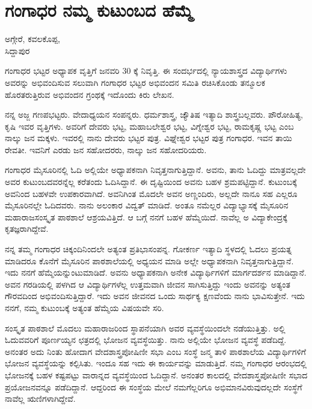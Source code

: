 {\fontsize{14}{16}\selectfont
\chapter{ಗಂಗಾಧರ ನಮ್ಮ ಕುಟುಂಬದ ಹೆಮ್ಮೆ}

\begin{center}
\smallskip

ಅಗ್ಗೇರೆ, ಕವಲಕೊಪ್ಪ,\\ 
ಸಿದ್ದಾಪುರ
\addrule
\end{center}
ಗಂಗಾಧರ ಭಟ್ಟರ ಅಧ್ಯಾಪಕ ವೃತ್ತಿಗೆ ಜನವರಿ 30 ಕ್ಕೆ ನಿವೃತ್ತಿ. ಈ ಸಂದರ್ಭದಲ್ಲಿ ನ್ಯಾಯಶಾಸ್ತ್ರದ ವಿದ್ಯಾರ್ಥಿಗಳು ಅವರನ್ನು ಅಭಿವಂದಿಸುವ ಸಲುವಾಗಿ ಗಂಗಾಧರ ಭಟ್ಟರ ಅಭಿವಂದನ ಸಮಿತಿ ರಚಿಸಿಕೊಂಡು ತನ್ಮೂಲಕ ಹೊರತರುತ್ತಿರುವ ಅಭಿವಂದನ ಗ್ರಂಥಕ್ಕೆ ಇದೊಂದು ಕಿರು ಲೇಖನ.

ನನ್ನ ಅಜ್ಜ ಗಣಪಭಟ್ಟರು. ವೇದಾಧ್ಯಯನ ಸಂಪನ್ನರು. ಧರ್ಮಶಾಸ್ತ್ರ, ಜ್ಯೌತಿಷ ಇತ್ಯಾದಿ ಶಾಸ್ತ್ರಬಲ್ಲವರು. ಪೌರೋಹಿತ್ಯ, ಕೃಷಿ ಇವರ ವೃತ್ತಿಗಳು. ಅವರಿಗೆ ದೇವರು ಭಟ್ಟ, ಮಹಾಬಲೇಶ್ವರ ಭಟ್ಟ, ವಿಗ್ನೇಶ್ವರ ಭಟ್ಟ, ರಾಮಕೃಷ್ಣ ಭಟ್ಟ ಎಂಬ ನಾಲ್ಕು ಜನ ಮಕ್ಕಳು. ಇವರಲ್ಲಿ ನಾನು ದೇವರು ಭಟ್ಟರ ಪುತ್ರ. ವಿಘ್ನೇಶ್ವರ ಭಟ್ಟರ ಪುತ್ರ ಗಂಗಾಧರ. ಇವನ ತಾಯಿ ರೇವತೀ. ಇವನಿಗೆ ಎರಡು ಜನ ಸಹೋದರರು, ನಾಲ್ಕು ಜನ ಸಹೋದರಿಯರು.

ಗಂಗಾಧರ ಮೈಸೂರಿನಲ್ಲಿ ಓದಿ ಅಲ್ಲಿಯೇ ಅಧ್ಯಾಪಕನಾಗಿ ನಿವೃತ್ತನಾಗುತ್ತಿದ್ದಾನೆ. ಅವನು, ತಾನು ಓದಿದ್ದು ಮಾತ್ರವಲ್ಲದೇ ಅವರ ಕುಟುಂಬದವರನ್ನೆಲ್ಲ ಕರೆತಂದು ಓದಿಸಿದ್ದಾನೆ. ಈ ದೃಷ್ಟಿಯಿಂದ ಅವನು ಬಹಳ ಶ್ರಮಪಟ್ಟಿದ್ದಾನೆ. ಕುಟುಂಬಕ್ಕೆ ಅವನಿಂದ ಬಹಳವೇ ಉಪಕಾರವಾಗಿದೆ. ಅವನಿಗಿಂತ ಮೊದಲೇ ಅವನ ಅಣ್ಣಂದಿರು, ಅಲ್ಲದೇ ನಾನೂ ಸಹ ಎಲ್ಲರೂ ಮೈಸೂರಿನಲ್ಲೇ ಓದಿದವರು. ನಾನು ಅಲಂಕಾರ ವಿದ್ವತ್ ಮಾಡಿದೆ. ಅಂತೂ ನಮೆಲ್ಲರ ವಿದ್ಯಾಭ್ಯಾಸಕ್ಕೆ ಮೈಸೂರಿನ ಮಹಾರಾಜಸಂಸ್ಕೃತ ಪಾಠಶಾಲೆ ಆಶ್ರಯ\-ವಿತ್ತಿದೆ. ಆ ಬಗ್ಗೆ ನನಗೆ ಬಹಳ ಹೆಮ್ಮೆಯಿದೆ. ನಾವೆಲ್ಲ ಅ ವಿದ್ಯಾಕೇಂದ್ರಕ್ಕೆ ಕೃತಜ್ಞರಾಗಿದ್ದೇವೆ. 

ನನ್ನ ತಮ್ಮ ಗಂಗಾಧರ ಚಿಕ್ಕಂದಿನಿಂದಲೇ ಅತ್ಯಂತ ಪ್ರತಿಭಾಸಂಪನ್ನ. ಗೋಕರ್ಣ ಇತ್ಯಾದಿ ಸ್ಥಳದಲ್ಲಿ ಓದಲು ಪ್ರಯತ್ನ ಮಾಡಿದರೂ ಕೊನೆಗೆ ಮೈಸೂರಿನ ಪಾಠಶಾಲೆಯಲ್ಲಿ ಅಧ್ಯಯನ ಮಾಡಿ ಅಲ್ಲೇ ಅಧ್ಯಾಪಕನಾಗಿ ನಿವೃತ್ತನಾಗುತ್ತಿದ್ದಾನೆ. ಇದು ನನಗೆ ಹೆಮ್ಮೆಯನ್ನುಂಟುಮಾಡಿದೆ. ಅವನು ಅಧ್ಯಾಪಕನಾಗಿ ಅನೇಕ ವಿದ್ಯಾರ್ಥಿಗಳಿಗೆ ಮಾರ್ಗದರ್ಶನ ಮಾಡಿದ್ದಾನೆ. ಅವನ ಗರಡಿಯಲ್ಲಿ ಪಳಗಿದ ಆ ವಿದ್ಯಾರ್ಥಿಗಳೆಲ್ಲ ಉತ್ತಮವಾಗಿ ಜೀವನ ಸಾಗಿಸುತ್ತಿದ್ದು ಇಂದು ಅವನನ್ನು ಅತ್ಯಂತ ಗೌರವದಿಂದ ಅಭಿವಂದಿಸುತ್ತಿದ್ದಾರೆ. ಇದು ಅವನ ಜೀವನದ ಒಂದು ಸಾರ್ಥಕ್ಯ ಕ್ಷಣವೆಂದು ನಾನು ಭಾವಿಸುತ್ತೇನೆ. ಇದು ನನಗೆ, ನಮ್ಮ ಕುಟುಂಬಕ್ಕೆ ಅತ್ಯಂತ ಹೆಮ್ಮೆಯ ವಿಷಯವೇ ಸರಿ.

ಸಂಸ್ಕೃತ ಪಾಠಶಾಲೆ ಮೊದಲು ಮಹಾರಾಜರಿಂದ ಸ್ಥಾಪನೆಯಾಗಿ ಅವರ ವ್ಯವಸ್ಥೆಯಿಂದಲೇ ನಡೆಯುತ್ತಿತ್ತು. ಅಲ್ಲಿ ಓದುವವರಿಗೆ ಪೂರ್ಣಯ್ಯನ ಛತ್ರದಲ್ಲಿ ಭೋಜನ ವ್ಯವಸ್ಥೆಯಿತ್ತು. ನಾನು ಅಲ್ಲಿಯೇ ಭೋಜನ ವ್ಯವಸ್ಥೆ ಪಡೆದಿದ್ದೆ. ಅನಂತರ ಅದು ನಿಂತು ಹೋದಾಗ ವೇದಶಾಸ್ತ್ರಪೋಷಿಣೀ ಸಭಾ ಎಂಬ ಸಂಸ್ಥೆ ಜನ್ಮ ತಾಳಿ ಪಾಠಶಾಲೆಯ ವಿದ್ಯಾರ್ಥಿ\-ಗಳಿಗೆ ಭೋಜನ ವ್ಯವಸ್ಥೆಯನ್ನು ಕಲ್ಪಿಸಿತು. ಇಂದೂ ಸಹ ಇದು ಈ ಕಾರ್ಯವನ್ನು ಮಾಡುತ್ತಿದೆ. ನಮ್ಮ ಗಂಗಾಧರ ಆರಂಭದಲ್ಲಿ ಭೋಜನಕ್ಕೆ ಬಹಳ ಕಷ್ಟಪಟ್ಟು ವಾರಾನ್ನದ ವ್ಯವಸ್ಥೆಯಿಂದ ಓದಿದ್ದಾನೆ. ಅನಂತರ ಕಾಲದಲ್ಲಿ ವೇದಶಾಸ್ತ್ರಪೋಷಿಣೀ ಸಭಾದ ಪ್ರಯೋಜನವನ್ನೂ ಪಡೆದಿದ್ದಾನೆ. ಆದ್ದರಿಂದ ಈ ಸಂಸ್ಥೆಯ ಮೇಲೆ ನಮಗೆಲ್ಲರಿಗೂ ಅಭಿಮಾನವಿರುವುದಲ್ಲದೇ ಸಂಸ್ಥೆಗೆ ನಾವೆಲ್ಲ ಋಣಿಗಳಾಗಿದ್ದೇವೆ. 

}
